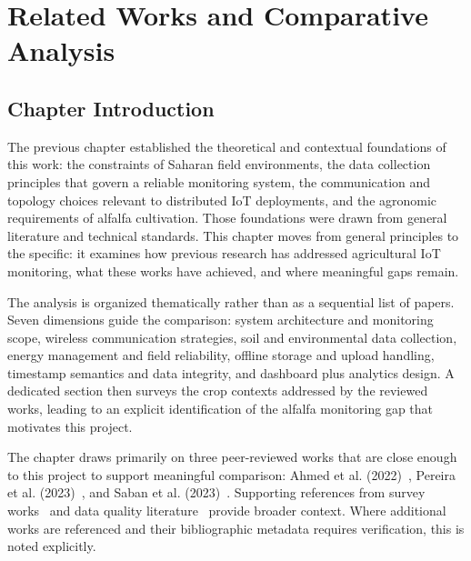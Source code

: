 
\chapter{Related Works and Comparative Analysis}
\label{chap:related-works}

\section{Chapter Introduction}
\label{sec:ch2-intro}

The previous chapter established the theoretical and contextual foundations of
this work: the constraints of Saharan field environments, the data collection
principles that govern a reliable monitoring system, the communication and
topology choices relevant to distributed IoT deployments, and the agronomic
requirements of alfalfa cultivation. Those foundations were drawn from general
literature and technical standards. This chapter moves from general principles to
the specific: it examines how previous research has addressed agricultural IoT
monitoring, what these works have achieved, and where meaningful gaps remain.

The analysis is organized thematically rather than as a sequential list of papers.
Seven dimensions guide the comparison: system architecture and monitoring scope,
wireless communication strategies, soil and environmental data collection,
energy management and field reliability, offline storage and upload handling,
timestamp semantics and data integrity, and dashboard plus analytics design.
A dedicated section then surveys the crop contexts addressed by the reviewed
works, leading to an explicit identification of the alfalfa monitoring gap that
motivates this project.

The chapter draws primarily on three peer-reviewed works that are close enough
to this project to support meaningful comparison: Ahmed et al.
(2022)~\cite{ahmed2022lora_agriculture_chile}, Pereira et al.
(2023)~\cite{pereira2023esp32_drip_irrigation}, and Saban et al.
(2023)~\cite{saban2023smart_agricultural_lora_cloud}. Supporting references
from survey works~\cite{ayaz2019iot_smart_agriculture_survey,farooq2019iot_smart_agriculture_review}
and data quality literature~\cite{teh2020sensor_data_quality,dandrifosse2024weather_qc_agriculture}
provide broader context. Where additional works are referenced and their
bibliographic metadata requires verification, this is noted explicitly.


